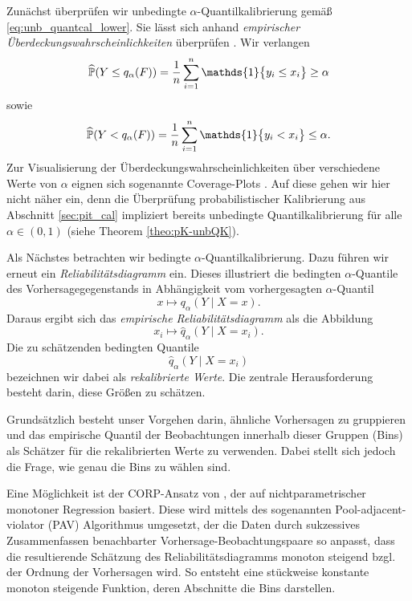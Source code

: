 Zunächst überprüfen wir unbedingte $\alpha$-Quantilkalibrierung gemäß \eqref{eq:unb_quantcal_lower}. Sie lässt sich anhand \emph{empirischer Überdeckungswahrscheinlichkeiten} überprüfen \parencite{gneiting2023model}. Wir verlangen 
\begin{equation}\label{eq:coverage} 
\widehat{\PW}(Y\leq q_{\alpha}(F))=\frac{1}{n}\sum_{i=1}^{n}\mathds{1}\big\{y_i\leq x_i\big\}\ge \alpha
\end{equation}
sowie 
\begin{equation}\label{eq:coverage_low} 
\widehat{\PW}(Y < q_{\alpha}(F))=\frac{1}{n}\sum_{i=1}^{n}\mathds{1}\big\{y_i< x_i\big\} \le \alpha.
\end{equation}
Zur Visualisierung der Überdeckungswahrscheinlichkeiten über verschiedene Werte von $\alpha$ eignen sich sogenannte Coverage-Plots \parencite{gneiting2023model}. Auf diese gehen wir hier nicht näher ein, denn die Überprüfung probabilistischer Kalibrierung aus Abschnitt \ref{sec:pit_cal} impliziert bereits unbedingte Quantilkalibrierung für alle $\alpha \in (0,1)$ (siehe Theorem \ref{theo:pK-unbQK}).

Als Nächstes betrachten wir bedingte $\alpha$-Quantilkalibrierung. Dazu führen wir erneut ein \emph{Reliabilitätsdiagramm} ein. Dieses illustriert die bedingten $\alpha$-Quantile des Vorhersagegegenstands in Abhängigkeit vom vorhergesagten $\alpha$-Quantil \parencite{gneiting2023regression,gneiting2023model}
\begin{equation}\label{eq:rediag}
    x \mapsto q_\alpha(Y \mid X = x).
\end{equation}
Daraus ergibt sich das \emph{empirische Reliabilitätsdiagramm} als die Abbildung
\begin{equation}\label{eq:emp_rediag}
    x_i \mapsto \hat q_\alpha(Y \mid X = x_i).
\end{equation} Die zu schätzenden bedingten Quantile
\[
\hat{q}_\alpha(Y \mid X = x_i)
\]
bezeichnen wir dabei als \emph{rekalibrierte Werte}. Die zentrale Herausforderung besteht darin, diese Größen zu schätzen. 

Grundsätzlich besteht unser Vorgehen darin, ähnliche Vorhersagen zu gruppieren und das empirische Quantil der Beobachtungen innerhalb dieser Gruppen (Bins) als Schätzer für die rekalibrierten Werte zu verwenden. Dabei stellt sich jedoch die Frage, wie genau die Bins zu wählen sind.

Eine Möglichkeit ist der CORP-Ansatz von \textcite{gneiting2023regression}, der auf nichtparametrischer monotoner Regression basiert. Diese wird mittels des sogenannten Pool-adjacent-violator (PAV) Algorithmus umgesetzt, der die Daten durch sukzessives Zusammenfassen benachbarter Vorhersage-Beobachtungspaare so anpasst, dass die resultierende Schätzung des Reliabilitätsdiagramms monoton steigend bzgl. der Ordnung der Vorhersagen wird. So entsteht eine stückweise konstante monoton steigende Funktion, deren Abschnitte die Bins darstellen.

